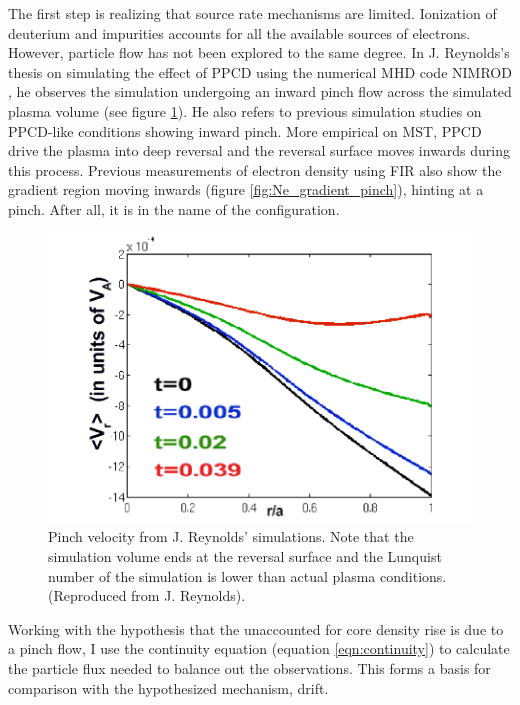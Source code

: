 The first step is realizing that source rate mechanisms are limited. Ionization of deuterium and impurities accounts for all the available sources of electrons. However, particle flow has not been explored to the same degree. In J. Reynolds's thesis on simulating the effect of PPCD using the numerical MHD code NIMROD \cite{Reynolds2007}, he observes the simulation undergoing an inward pinch flow across the simulated plasma volume (see figure \ref{fig:NIMROD_pinch}). He also refers to previous simulation studies on PPCD-like conditions showing inward pinch\cite{StuffThatReynoldCited}. More empirical on MST, PPCD drive the plasma into deep reversal and the reversal surface moves inwards during this process. Previous measurements of electron density using FIR also show the gradient region moving inwards (figure \ref{fig:Ne_gradient_pinch}), hinting at a pinch. After all, it is in the name of the configuration.

\begin{figure}
    \centering
    \includegraphics{ion_transport_results/reynold_pinch.png}
    \caption{Pinch velocity from J. Reynolds' simulations. Note that the simulation volume ends at the reversal surface and the Lunquist number of the simulation is lower than actual plasma conditions. (Reproduced from J. Reynolds\cite{ReynoldsThesis}). }
    \label{fig:NIMROD_pinch}
\end{figure}


Working with the hypothesis that the unaccounted for core density rise is due to a pinch flow, I use the continuity equation (equation \ref{eqn:continuity}) to calculate the particle flux needed to balance out the observations. This forms a basis for comparison with the hypothesized mechanism, \ecb drift.

